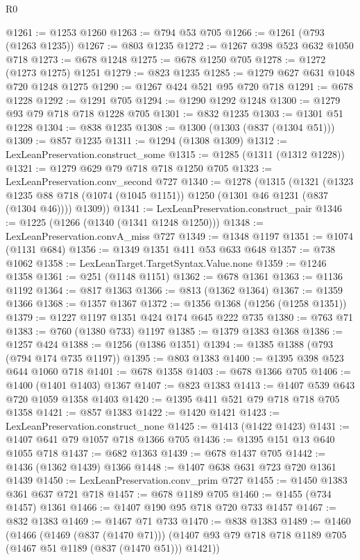 \begin{lexlean}{R0}
\begin{coremodule}
{{{{{{{{{{{{{{{{{{{{{{{{{{{{{{{{@1261 := @1253 @1260
@1263 := @794 @53 @705
@1266 := @1261 (@793 (@1263 @1235))
@1267 := @803 @1235
@1272 := @1267 @398 @523 @632 @1050 @718
@1273 := @678 @1248
@1275 := @678 @1250 @705
@1278 := @1272 (@1273 @1275) @1251
@1279 := @823 @1235
@1285 := @1279 @627 @631 @1048 @720 @1248 @1275
@1290 := @1267 @424 @521 @95 @720 @718
@1291 := @678 @1228
@1292 := @1291 @705
@1294 := @1290 @1292 @1248
@1300 := @1279 @93 @79 @718 @718 @1228 @705
@1301 := @832 @1235
@1303 := @1301 @51 @1228
@1304 := @838 @1235
@1308 := @1300 (@1303 (@837 (@1304 @51)))
@1309 := @857 @1235
@1311 := @1294 (@1308 @1309)
@1312 := LexLeanPreservation.construct_some
@1315 := @1285 (@1311 (@1312 @1228))
@1321 := @1279 @629 @79 @718 @718 @1250 @705
@1323 := LexLeanPreservation.conv_second @727
@1340 := @1278
    (@1315
      (@1321
        (@1323 @1235 @88 @718 (@1074 (@1045 @1151)) @1250 (@1301 @46 @1231 (@837 (@1304 @46))))
        @1309))
@1341 := LexLeanPreservation.construct_pair
@1346 := @1225 (@1266 (@1340 (@1341 @1248 @1250)))
@1348 := LexLeanPreservation.convA_miss @727
@1349 := @1348 @1197
@1351 := @1074 (@1131 @684)
@1356 := @1349 @1351 @411 @53 @633 @648
@1357 := @738 @1062
@1358 := LexLeanTarget.TargetSyntax.Value.none
@1359 := @1246 @1358
@1361 := @251 (@1148 @1151)
@1362 := @678 @1361
@1363 := @1136 @1192
@1364 := @817 @1363
@1366 := @813 (@1362 @1364)
@1367 := @1359 @1366
@1368 := @1357 @1367
@1372 := @1356 @1368 (@1256 (@1258 @1351))
@1379 := @1227 @1197 @1351 @424 @174 @645 @222 @735
@1380 := @763 @71
@1383 := @760 (@1380 @733) @1197
@1385 := @1379 @1383 @1368
@1386 := @1257 @424
@1388 := @1256 (@1386 @1351)
@1394 := @1385 @1388 (@793 (@794 @174 @735 @1197))
@1395 := @803 @1383
@1400 := @1395 @398 @523 @644 @1060 @718
@1401 := @678 @1358
@1403 := @678 @1366 @705
@1406 := @1400 (@1401 @1403) @1367
@1407 := @823 @1383
@1413 := @1407 @539 @643 @720 @1059 @1358 @1403
@1420 := @1395 @411 @521 @79 @718 @718 @705 @1358
@1421 := @857 @1383
@1422 := @1420 @1421
@1423 := LexLeanPreservation.construct_none
@1425 := @1413 (@1422 @1423)
@1431 := @1407 @641 @79 @1057 @718 @1366 @705
@1436 := @1395 @151 @13 @640 @1055 @718
@1437 := @682 @1363
@1439 := @678 @1437 @705
@1442 := @1436 (@1362 @1439) @1366
@1448 := @1407 @638 @631 @723 @720 @1361 @1439
@1450 := LexLeanPreservation.conv_prim @727
@1455 := @1450 @1383 @361 @637 @721 @718
@1457 := @678 @1189 @705
@1460 := @1455 (@734 @1457) @1361
@1466 := @1407 @190 @95 @718 @720 @733 @1457
@1467 := @832 @1383
@1469 := @1467 @71 @733
@1470 := @838 @1383
@1489 := @1460
    (@1466
      (@1469 (@837 (@1470 @71)))
      (@1407 @93 @79 @718 @718 @1189 @705 (@1467 @51 @1189 (@837 (@1470 @51))) @1421))
}}}}}}}}}}}}}}}}}}}}}}}}}}}}}}}}
\end{coremodule}
\end{lexlean}
